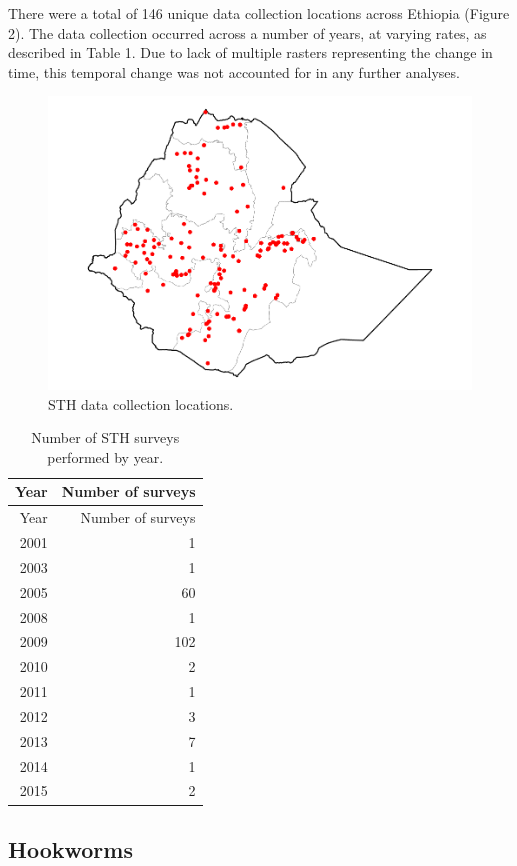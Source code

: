 \documentclass[
]{article}
\begin{document}
There were a total of 146 unique data collection locations across
Ethiopia (Figure 2). The data collection occurred across a number of
years, at varying rates, as described in Table 1. Due to lack of
multiple rasters representing the change in time, this temporal change
was not accounted for in any further analyses.

\begin{figure}
\centering
\includegraphics{write_up_files/figure-latex/STH_locations-1.pdf}
\caption{STH data collection locations.}
\end{figure}

\begin{longtable}[]{@{}rr@{}}
\caption{Number of STH surveys performed by year.}\tabularnewline
\toprule
Year & Number of surveys \\
\midrule
\endfirsthead
\toprule
Year & Number of surveys \\
\midrule
\endhead
2001 & 1 \\
2003 & 1 \\
2005 & 60 \\
2008 & 1 \\
2009 & 102 \\
2010 & 2 \\
2011 & 1 \\
2012 & 3 \\
2013 & 7 \\
2014 & 1 \\
2015 & 2 \\
\bottomrule
\end{longtable}

\hypertarget{hookworms}{%
\subsection{Hookworms}\label{hookworms}}
\end{document}
